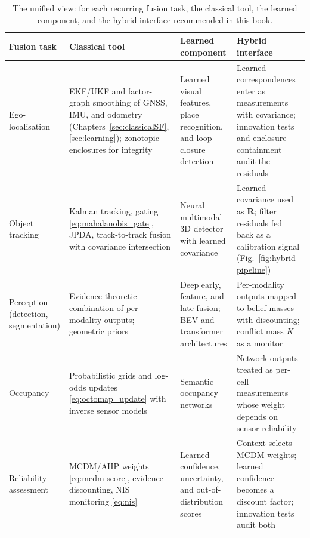 \documentclass[graybox,envcountchap]{style/SNmono}
\providecommand{\DIFaddbeginFL}{} %
\providecommand{\DIFaddendFL}{} %
\providecommand{\DIFdelbeginFL}{} %
\providecommand{\DIFdelendFL}{} %
\begin{document}
\begin{table}[!t]
\caption{The unified view: for each recurring fusion task, the classical tool, the learned component, and the hybrid interface recommended in this book.}
\label{tab:unified-view}
\footnotesize
\renewcommand{\arraystretch}{1.25}
\setlength{\tabcolsep}{3pt}
\DIFdelbeginFL %
\DIFdelendFL \DIFaddbeginFL \begin{tabular}{>{\raggedright\arraybackslash}p{} >{\raggedright\arraybackslash}p{} >{\raggedright\arraybackslash}p{} >{\raggedright\arraybackslash}p{}}
\DIFaddendFL \toprule
Fusion task & Classical tool & Learned component & Hybrid interface \\
\midrule
Ego-localisation & EKF/UKF and factor-graph smoothing of GNSS, IMU, and odometry (Chapters~\ref{sec:classicalSF}, \ref{sec:learning}); zonotopic enclosures for integrity & Learned visual features, place recognition, and loop-closure detection & Learned correspondences enter as measurements with covariance; innovation tests and enclosure containment audit the residuals \\[2pt]
Object tracking & Kalman tracking, gating \eqref{eq:mahalanobis_gate}, JPDA, track-to-track fusion with covariance intersection & Neural multimodal 3D detector with learned covariance & Learned covariance used as $\mathbf{R}$; filter residuals fed back as a calibration signal (Fig.~\ref{fig:hybrid-pipeline}) \\[2pt]
Perception (detection, segmentation) & Evidence-theoretic combination of per-modality outputs; geometric priors & Deep early, feature, and late fusion; BEV and transformer architectures & Per-modality outputs mapped to belief masses with discounting; conflict mass $K$ as a monitor \\[2pt]
Occupancy & Probabilistic grids and log-odds updates \eqref{eq:octomap_update} with inverse sensor models & Semantic occupancy networks & Network outputs treated as per-cell measurements whose weight depends on sensor reliability \\[2pt]
Reliability assessment & MCDM/AHP weights \eqref{eq:mcdm-score}, evidence discounting, NIS monitoring \eqref{eq:nis} & Learned confidence, uncertainty, and out-of-distribution scores & Context selects MCDM weights; learned confidence becomes a discount factor; innovation tests audit both \\[2pt]

\end{tabular}
\end{table}
\end{document}
